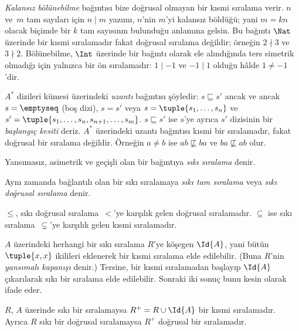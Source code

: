 \documentclass[../../../include/open-logic-section]{subfiles}
\begin{document}
\begin{ex}
\emph{Kalansız bölünebilme} bağıntısı bize doğrusal olmayan bir kısmi sıralama
verir. $n$ ve~$m$ tam sayıları için $n \mid m$ yazımı, $n$'nin $m$'yi kalansız
böldüğü; yani $m=kn$ olacak biçimde bir $k$ tam sayısının bulunduğu anlamına
gelsin. Bu bağıntı $\Nat$ üzerinde bir kısmi sıralamadır fakat doğrusal sıralama
değildir; örneğin $2 \nmid 3$ ve $3 \nmid 2$. Bölünebilme, $\Int$ üzerinde bir
bağıntı olarak ele alındığında ters simetrik olmadığı için yalnızca bir ön
sıralamadır: $1 \mid -1$ ve $-1 \mid 1$ olduğu hâlde $1 \neq -1$'dir.
\end{ex}

\begin{ex}
$A^*$ dizileri kümesi üzerindeki \emph{uzantı} bağıntısı şöyledir:
$s \sqsubseteq s'$ ancak ve ancak $s=\emptyseq$ (boş dizi), $s=s'$ veya
$s=\tuple{s_1, \dots, s_n}$ ve
$s'=\tuple{s_1, \dots, s_n, s_{n+1}, \dots, s_m}$. $s \sqsubseteq s'$ ise
$s$'ye ayrıca $s'$ dizisinin bir \emph{başlangıç kesiti} deriz. $A^*$
üzerindeki uzantı bağıntısı kısmi bir sıralamadır, fakat doğrusal bir sıralama
değildir. Örneğin $a \neq b$ ise $ab \not\sqsubseteq ba$ ve
$ba \not\sqsubseteq ab$ olur.
\end{ex}

\begin{defn}
Yansımasız, asimetrik ve geçişli olan bir bağıntıya \emph{sıkı sıralama} denir.
\end{defn}

\begin{defn}
Aynı zamanda bağlantılı olan bir sıkı sıralamaya \emph{sıkı tam sıralama} veya
\emph{sıkı doğrusal sıralama} denir.
\end{defn}

\begin{ex}
$\le$, sıkı doğrusal sıralama~$<$'ye karşılık gelen doğrusal sıralamadır.
$\subseteq$ ise sıkı sıralama~$\subsetneq$'ye karşılık gelen kısmi sıralamadır.
\end{ex}

$A$ üzerindeki herhangi bir sıkı sıralama $R$'ye köşegen $\Id{A}$, yani bütün
$\tuple{x,x}$ ikilileri eklenerek bir kısmi sıralama elde edilebilir. (Buna
$R$'nin \emph{yansımalı kapanışı} denir.) Tersine, bir kısmi sıralamadan
başlayıp $\Id{A}$ çıkarılarak sıkı bir sıralama elde edilebilir. Sonraki iki
sonuç bunu kesin olarak ifade eder.

\begin{prop}
$R$, $A$ üzerinde sıkı bir sıralamaysa $R^+=R\cup\Id{A}$ bir kısmi sıralamadır.
Ayrıca $R$ sıkı bir doğrusal sıralamaysa $R^+$ doğrusal bir sıralamadır.
\end{prop}
\end{document}
